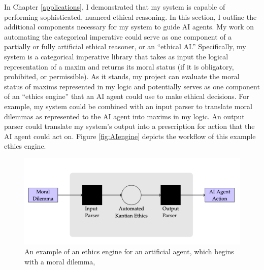 %
\begin{isabellebody}%
%
%
\isadelimtheory
%
\endisadelimtheory
%
\isatagtheory
%
\endisatagtheory
{\isafoldtheory}%
%
\isadelimtheory
%
\endisadelimtheory
%
\isadelimdocument
%
\endisadelimdocument
%
\isatagdocument
%
\isamarkuptrue%
%
\isamarkuptrue%
%
\endisatagdocument
{\isafolddocument}%
%
\isadelimdocument
%
\endisadelimdocument
%
\begin{isamarkuptext}%
In Chapter \ref{applications}, I demonstrated that my system is capable of performing sophisticated,
nuanced ethical reasoning. In this section, I outline the additional components necessary for my system
to guide AI agents. My work on automating the categorical imperative 
could serve as one component of a partially or fully artificial ethical reasoner, or an ``ethical AI.''
Specifically, my system is a categorical imperative library that takes as input the logical representation 
of a maxim and returns its moral status (if it is obligatory, prohibited, or permissible).
As it stands, my project can evaluate the moral status of maxims represented in my logic and potentially 
serves as one component of an ``ethics engine'' that an AI agent could use to make ethical decisions.
For example, my system could be combined with an input parser to translate moral dilemmas as represented 
to the AI agent into maxims in my logic. An output parser could translate my system's output
into a prescription for action that the AI agent could act on. Figure \ref{fig:AIengine} depicts the 
workflow of this example ethics engine.%
\end{isamarkuptext}\isamarkuptrue%
%
\begin{figure}
\centering
\includegraphics[scale=0.5]{AI_engine.png}
\caption{An example of an ethics engine for an artificial agent, which begins with a moral dilemma, 
}
\end{figure}
\end{isabellebody}
